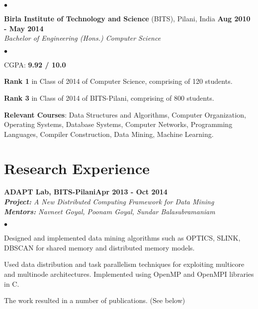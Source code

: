 \documentclass[margin,line]{res}
\newenvironment{list2}{
  \begin{list}{$\bullet$}{%
      \setlength{\itemsep}{0in}
      \setlength{\parsep}{0in} \setlength{\parskip}{0in}
      \setlength{\topsep}{0in} \setlength{\partopsep}{0in} 
      \setlength{\leftmargin}{0.2in}}}{\end{list}}
\begin{document}
\begin{resume}
\begin{list2}
\end{list2}
{\bf Birla Institute of Technology and Science} (BITS), Pilani, India \hfill {\bf {Aug 2010 - May 2014}}\\
{\em Bachelor of Engineering (Hons.) Computer Science }
\vspace*{.3cm}
\begin{list2}
\item CGPA:  {\bf {9.92 / 10.0}}
\item {\bf Rank 1} in Class of 2014 of Computer Science, comprising of 120 students. 
\item {\bf Rank 3} in Class of 2014 of BITS-Pilani, comprising of 800 students.
\item {\bf Relevant Courses}: Data Structures and Algorithms, Computer Organization, Operating Systems, Database Systems, Computer Networks, Programming Languages, Compiler Construction, Data Mining, Machine Learning.

\end{list2}


\section{\sc Research Experience}



{\bf ADAPT Lab, BITS-Pilani}\hfill {\bf Apr 2013 - Oct 2014}\\
{\em {\bf Project:} A New Distributed Computing Framework for Data Mining} \\
{\em {\bf Mentors:} Navneet Goyal, Poonam Goyal, Sundar Balasubramaniam}
\vspace{.3cm}
\begin{list2}
\item Designed and implemented data mining algorithms such as OPTICS, SLINK, DBSCAN for shared memory and
distributed memory models.
\item Used data distribution and task parallelism techniques for exploiting multicore and multinode
architectures. Implemented using OpenMP and OpenMPI libraries in C.
\item The work resulted in a number of publications. (See below)
\end{list2}


\end{resume}
\end{document}
